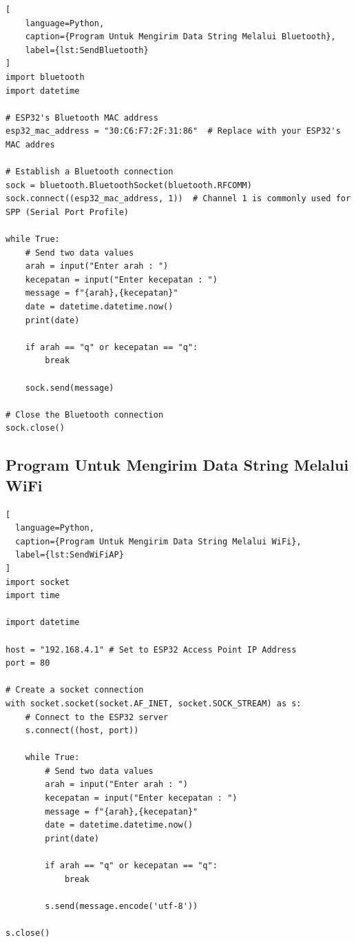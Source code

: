 \begin{lstlisting}[
    language=Python,
    caption={Program Untuk Mengirim Data String Melalui Bluetooth},
    label={lst:SendBluetooth}
]
import bluetooth
import datetime

# ESP32's Bluetooth MAC address
esp32_mac_address = "30:C6:F7:2F:31:86"  # Replace with your ESP32's MAC addres

# Establish a Bluetooth connection
sock = bluetooth.BluetoothSocket(bluetooth.RFCOMM)
sock.connect((esp32_mac_address, 1))  # Channel 1 is commonly used for SPP (Serial Port Profile)

while True:
    # Send two data values
    arah = input("Enter arah : ")
    kecepatan = input("Enter kecepatan : ")
    message = f"{arah},{kecepatan}"
    date = datetime.datetime.now()
    print(date)
    
    if arah == "q" or kecepatan == "q":
        break
    
    sock.send(message)

# Close the Bluetooth connection
sock.close()

\end{lstlisting}

\subsection{Program Untuk Mengirim Data String Melalui WiFi}

\begin{lstlisting}[
  language=Python,
  caption={Program Untuk Mengirim Data String Melalui WiFi},
  label={lst:SendWiFiAP}
]
import socket
import time

import datetime

host = "192.168.4.1" # Set to ESP32 Access Point IP Address
port = 80

# Create a socket connection
with socket.socket(socket.AF_INET, socket.SOCK_STREAM) as s:
    # Connect to the ESP32 server
    s.connect((host, port))
    
    while True:
        # Send two data values
        arah = input("Enter arah : ")
        kecepatan = input("Enter kecepatan : ")
        message = f"{arah},{kecepatan}"
        date = datetime.datetime.now()
        print(date)
    
        if arah == "q" or kecepatan == "q":
            break
    
        s.send(message.encode('utf-8'))
        
s.close()

\end{lstlisting}

